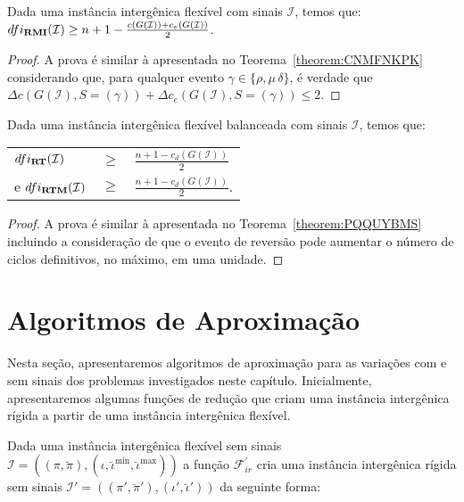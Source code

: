 \begin{theorem}\label{theorem:XQPRYMFX}
Dada uma instância intergênica flexível com sinais $\mathcal{I}$, temos que:\break $dfi_{\textbf{RMI}}(\mathcal{I}) \ge {n+1} - \frac{c(G(\mathcal{I} )) + c_e(G(\mathcal{I} ))}{2}$.
\end{theorem}
\begin{proof}
A prova é similar à apresentada no Teorema~\ref{theorem:CNMFNKPK} considerando que, para qualquer evento $\gamma \in \{\rho, \mu\,\delta\}$, é verdade que $\Delta c(G(\mathcal{I}), S=(\gamma)) + \Delta c_e(G(\mathcal{I}), S=(\gamma)) \le 2$.
\end{proof}

\begin{theorem}\label{theorem:HELIIGVZ}
Dada uma instância intergênica flexível balanceada com sinais $\mathcal{I}$, temos que:

\begin{tabular}{lll}
  $dfi_{\textbf{RT}}(\mathcal{I})$     & $ \ge $ & $\frac{{n+1} - c_d(G(\mathcal{I} ))}{2}$  \\
  e $dfi_{\textbf{RTM}}(\mathcal{I})$  & $ \ge $ & $\frac{{n+1} - c_d(G(\mathcal{I} ))}{2}$. \\
\end{tabular}
\end{theorem}
\begin{proof}
A prova é similar à apresentada no Teorema~\ref{theorem:PQQUYBMS} incluindo a consideração de que o evento de reversão pode aumentar o número de ciclos definitivos, no máximo, em uma unidade.
\end{proof}

\section{Algoritmos de Aproximação}

Nesta seção, apresentaremos algoritmos de aproximação para as variações com e sem sinais dos problemas investigados neste capítulo. Inicialmente, apresentaremos algumas funções de redução que criam uma instância intergênica rígida a partir de uma instância intergênica flexível.

Dada uma instância intergênica flexível sem sinais $\mathcal{I} = ((\pi,\breve\pi),(\iota,\breve\iota^{\min},\breve\iota^{\max}))$ a função $\mathcal{F}_{ir}^{'}$ cria uma instância intergênica rígida sem sinais $\mathcal{I'} = ((\pi',\breve\pi'),(\iota',\breve\iota'))$ da seguinte forma:

